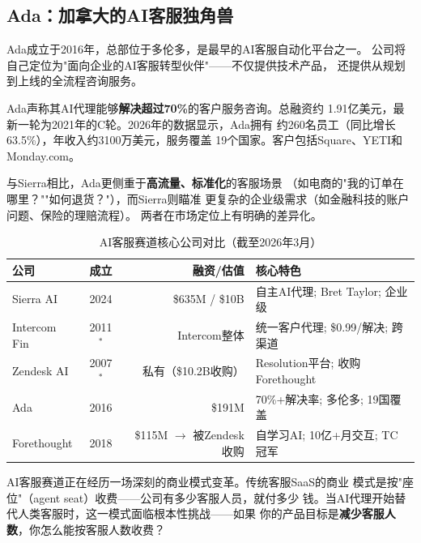 \subsection{Ada：加拿大的AI客服独角兽}
\label{subsec:ada-cx}

Ada成立于2016年，总部位于多伦多，是最早的AI客服自动化平台之一。
公司将自己定位为"面向企业的AI客服转型伙伴"——不仅提供技术产品，
还提供从规划到上线的全流程咨询服务。

Ada声称其AI代理能够\textbf{解决超过70\%}的客户服务咨询。总融资约
1.91亿美元，最新一轮为2021年的C轮。2026年的数据显示，Ada拥有
约260名员工（同比增长63.5\%），年收入约3100万美元，服务覆盖
19个国家。客户包括Square、YETI和Monday.com。

与Sierra相比，Ada更侧重于\textbf{高流量、标准化}的客服场景
（如电商的"我的订单在哪里？""如何退货？"），而Sierra则瞄准
更复杂的企业级需求（如金融科技的账户问题、保险的理赔流程）。
两者在市场定位上有明确的差异化。

\begin{table}[htbp]
\centering
\caption{AI客服赛道核心公司对比（截至2026年3月）}
\label{tab:ai-cs-comparison}
\small
\begin{tabularx}{\textwidth}{l c r X}
\toprule
\rowcolor{figLightGray}
\textbf{公司} & \textbf{成立} & \textbf{融资/估值}
  & \textbf{核心特色} \\
\midrule
Sierra AI   & 2024 & \$635M / \$10B
  & 自主AI代理; Bret Taylor; 企业级 \\
Intercom Fin & 2011$^*$ & Intercom整体
  & 统一客户代理; \$0.99/解决; 跨渠道 \\
Zendesk AI  & 2007$^*$ & 私有（\$10.2B收购）
  & Resolution平台; 收购Forethought \\
Ada         & 2016 & \$191M
  & 70\%+解决率; 多伦多; 19国覆盖 \\
Forethought & 2018 & \$115M $\to$ 被Zendesk收购
  & 自学习AI; 10亿+月交互; TC冠军 \\
\bottomrule
\end{tabularx}

\medskip
{}
\end{table}

AI客服赛道正在经历一场深刻的商业模式变革。传统客服SaaS的商业
模式是按"座位"（agent seat）收费——公司有多少客服人员，就付多少
钱。当AI代理开始替代人类客服时，这一模式面临根本性挑战——如果
你的产品目标是\textbf{减少客服人数}，你怎么能按客服人数收费？

